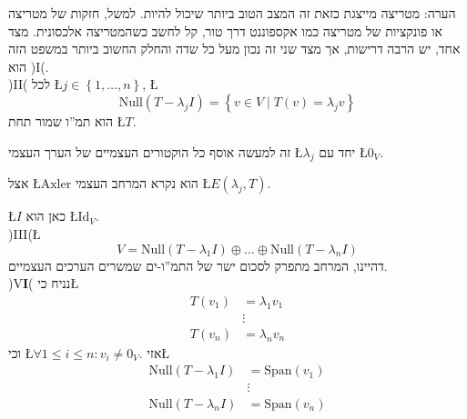 \documentclass[english,hebrew]{article}
\begin{document}
הערה: מטריצה מייצגת כזאת זה המצב הטוב ביותר שיכול להיות. למשל, חזקות
של מטריצה או פונקציות של מטריצה כמו אקספוננט דרך טור, קל לחשב כשהמטריצה
אלכסונית. מצד אחד, יש הרבה דרישות, אך מצד שני זה נכון מעל כל שדה והחלק
החשוב ביותר במשפט הזה הוא )I(.\\

)II( לכל \L{$j\in\left\{ 1,\dots,n\right\} $}, \L{%
\[
\text{Null}(T-\lambda_{j}I)=\left\{ v\in V\mid T(v)=\lambda_{j}v\right\} 
\]
}%
הוא תמ\textquotedblright ו שמור תחת \L{$T$}.

זה למעשה אוסף כל הוקטורים העצמיים של הערך העצמי \L{$\lambda_{j}$}
יחד עם \L{$0_{V}$}.

אצל \L{$\text{Axler}$} הוא נקרא המרחב העצמי \L{$E(\lambda_{j},T)$}.

\L{$I$} כאן הוא \L{$\text{Id}_{V}$}.\\

)III(\L{%
\[
V=\text{Null}(T-\lambda_{1}I)\oplus\dots\oplus\text{Null}(T-\lambda_{n}I)
\]
}%
דהיינו, המרחב מתפרק לסכום ישר של התמ\textquotedblright ו-ים שמשרים
הערכים העצמיים. \\

)V\textbf{I}( נניח כי\L{%
\begin{align*}
T(v_{1}) & =\lambda_{1}v_{1}\\
 & \vdots\\
T(v_{n}) & =\lambda_{n}v_{n}
\end{align*}
}%
וכי \L{$\forall1\le i\le n:v_{i}\ne0_{V}$}. אזי\L{%
\begin{align*}
\text{Null}(T-\lambda_{1}I) & =\text{Span}(v_{1})\\
 & \vdots\\
\text{Null}(T-\lambda_{n}I) & =\text{Span}(v_{n})
\end{align*}
}%
\end{document}
